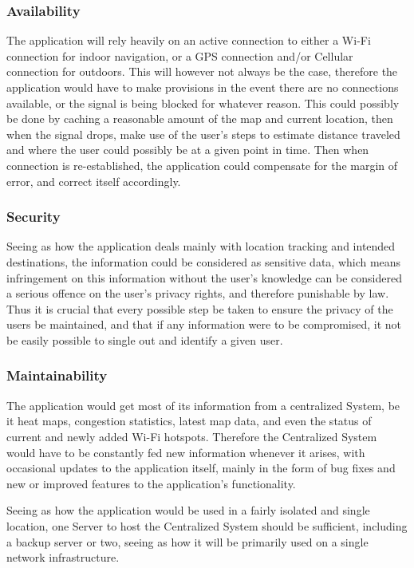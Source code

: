 \documentclass[12pt]{article}
\begin{document}
		\subsubsection{Availability}
		The application will rely heavily on an active connection to either a Wi-Fi connection for indoor navigation, or a GPS connection and/or Cellular connection for outdoors.  This will however not always be the case, therefore the application would have to make provisions in the event there are no connections available, or the signal is being blocked for whatever reason.  This could possibly be done by caching a reasonable amount of the map and current location, then when the signal drops, make use of the user’s steps to estimate distance traveled and where the user could possibly be at a given point in time.  Then when connection is re-established, the application could compensate for the margin of error, and correct itself accordingly.  
		
		\subsubsection{Security}
		Seeing as how the application deals mainly with location tracking and intended destinations, the information could be considered as sensitive data, which means infringement on this information without the user’s knowledge can be considered a serious offence on the user’s privacy rights, and therefore punishable by law.  Thus it is crucial that every possible step be taken to ensure the privacy of the users be maintained, and that if any information were to be compromised, it not be easily possible to single out and identify a given user.  
		
		\subsubsection{Maintainability}
		The application would get most of its information from a centralized System, be it heat maps, congestion statistics, latest map data, and even the status of current and newly added Wi-Fi hotspots.  Therefore the Centralized System would have to be constantly fed new information whenever it arises, with occasional updates to the application itself, mainly in the form of bug fixes and new or improved features to the application’s functionality.  
		
		Seeing as how the application would be used in a fairly isolated and single location, one Server to host the Centralized System should be sufficient, including a backup server or two, seeing as how it will be primarily used on a single network infrastructure.  
		
\end{document}
